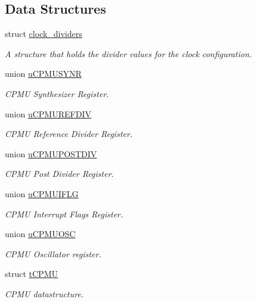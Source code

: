 \subsection*{Data Structures}
\begin{DoxyCompactItemize}
\item 
struct \hyperlink{structclock__dividers}{clock\+\_\+dividers}
\begin{DoxyCompactList}\small\item\em A structure that holds the divider values for the clock configuration. \end{DoxyCompactList}\item 
union \hyperlink{unionu_c_p_m_u_s_y_n_r}{u\+C\+P\+M\+U\+S\+Y\+N\+R}
\begin{DoxyCompactList}\small\item\em C\+P\+M\+U Synthesizer Register. \end{DoxyCompactList}\item 
union \hyperlink{unionu_c_p_m_u_r_e_f_d_i_v}{u\+C\+P\+M\+U\+R\+E\+F\+D\+I\+V}
\begin{DoxyCompactList}\small\item\em C\+P\+M\+U Reference Divider Register. \end{DoxyCompactList}\item 
union \hyperlink{unionu_c_p_m_u_p_o_s_t_d_i_v}{u\+C\+P\+M\+U\+P\+O\+S\+T\+D\+I\+V}
\begin{DoxyCompactList}\small\item\em C\+P\+M\+U Post Divider Register. \end{DoxyCompactList}\item 
union \hyperlink{unionu_c_p_m_u_i_f_l_g}{u\+C\+P\+M\+U\+I\+F\+L\+G}
\begin{DoxyCompactList}\small\item\em C\+P\+M\+U Interrupt Flags Register. \end{DoxyCompactList}\item 
union \hyperlink{unionu_c_p_m_u_o_s_c}{u\+C\+P\+M\+U\+O\+S\+C}
\begin{DoxyCompactList}\small\item\em C\+P\+M\+U Oscillator register. \end{DoxyCompactList}\item 
struct \hyperlink{structt_c_p_m_u}{t\+C\+P\+M\+U}
\begin{DoxyCompactList}\small\item\em C\+P\+M\+U datastructure. \end{DoxyCompactList}\end{DoxyCompactItemize}
